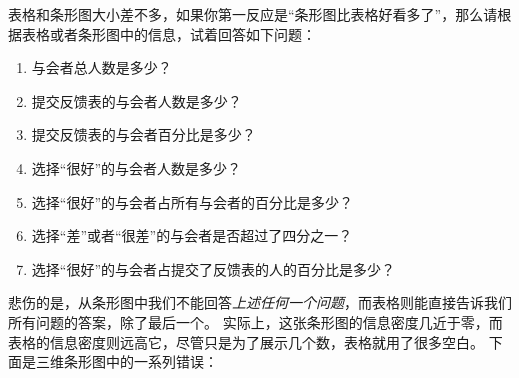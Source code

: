 \bohs

表格和条形图大小差不多，如果你第一反应是“条形图比表格好看多了”，那么请根据表格或者条形图中的信息，试着回答如下问题：

\eohs

\begin{enumerate}
\item
  与会者总人数是多少？
\item
  提交反馈表的与会者人数是多少？
\item
  提交反馈表的与会者百分比是多少？
\item
  选择“很好”的与会者人数是多少？
\item
  选择“很好”的与会者占所有与会者的百分比是多少？
\item
  选择“差”或者“很差”的与会者是否超过了四分之一？
\item
  选择“很好”的与会者占提交了反馈表的人的百分比是多少？

\end{enumerate}

\bohs

悲伤的是，从条形图中我们不能回答\emph{上述任何一个问题}，而表格则能直接告诉我们所有问题的答案，除了最后一个。
实际上，这张条形图的信息密度几近于零，而表格的信息密度则远高它，尽管只是为了展示几个数，表格就用了很多空白。
下面是三维条形图中的一系列错误：
\eohs

